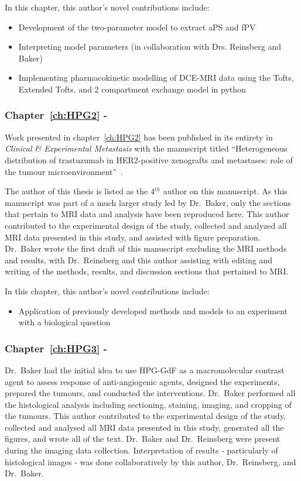 In this chapter, this author's novel contributions include:

\begin{itemize}
\item Development of the two-parameter model to extract \acs{aPS} and \acs{fPV}
\item Interpreting model parameters (in collaboration with Drs. Reinsberg and Baker)
\item Implementing pharmacokinetic modelling of DCE-MRI data using the Tofts, Extended Tofts, and 2 compartment exchange model in python
\end{itemize}

\subsubsection{Chapter~\ref{ch:HPG2} - }

Work presented in chapter~\ref{ch:HPG2} has been published in its entirety in \emph{Clinical \& Experimental Metastasis} with the manuscript titled ``Heterogeneous distribution of trastuzumab in HER2-positive xenografts and metastases: role of the tumour microenvironment''~\cite{Baker:2018ex}.

The author of this thesis is listed as the 4$^{th}$ author on this manuscript.
As this manuscript was part of a much larger study led by Dr.\ Baker, only the sections that pertain to MRI data and analysis have been reproduced here.
This author contributed to the experimental design of the study, collected and analyzed all MRI data presented in this study, and assisted with figure preparation.
Dr.\ Baker wrote the first draft of this manuscript excluding the MRI methods and results, with Dr.\ Reinsberg and this author assisting with editing and writing of the methods, results, and discussion sections that pertained to MRI.

In this chapter, this author's novel contributions include:

\begin{itemize}
\item Application of previously developed methods and models to an experiment with a biological question
\end{itemize}

\subsubsection{Chapter~\ref{ch:HPG3} - }

Dr.\ Baker had the initial idea to use \acs{HPG-GdF} as a macromolecular contrast agent to assess response of anti-angiogenic agents, designed the experiments, prepared the tumours, and conducted the interventions.
Dr.\ Baker performed all the histological analysis including sectioning, staining, imaging, and cropping of the tumours.
This author contributed to the experimental design of the study, collected and analysed all MRI data presented in this study, generated all the figures, and wrote all of the text. 
Dr.\ Baker and Dr.\ Reinsberg were present during the imaging data collection.
Interpretation of results - particularly of histological images - was done collaboratively by this author, Dr.\ Reinsberg, and Dr.\ Baker.


